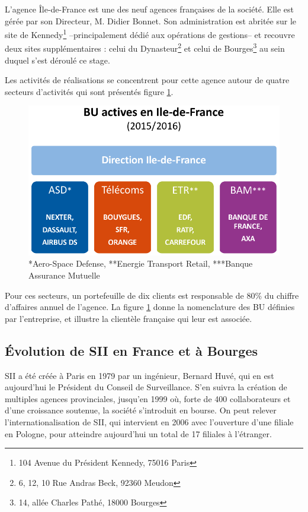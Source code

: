 L'agence Île-de-France est une des neuf agences françaises de la société. Elle est gérée par son Directeur, M. Didier Bonnet.
Son administration est abritée sur le site de Kennedy\footnote{104 Avenue du Président Kennedy, 75016 Paris} --principalement dédié aux opérations de gestions-- et recouvre deux sites supplémentaires : celui du 
Dynasteur\footnote{6, 12, 10 Rue Andras Beck, 92360 Meudon} et celui de Bourges\footnote{14, allée Charles Pathé, 18000 Bourges } au sein duquel s'est déroulé ce stage. 

Les activités de réalisations se concentrent pour cette agence autour de quatre secteurs d'activités qui sont présentés figure \ref{fig:BU-IDF}. 

\begin{figure}[h]
  \centering
    \includegraphics[width=.5\linewidth]{figures/BU-clients-IDF}
    \caption*{*Aero-Space Defense, **Energie Transport Retail, ***Banque Assurance Mutuelle}  
  \label{fig:BU-IDF}
\end{figure}

Pour ces secteurs, un portefeuille de dix clients est responsable de 80\% du chiffre d'affaires annuel de l'agence. 
La figure \ref{fig:BU-IDF} donne la nomenclature des \gls{BU} définies par l'entreprise, et illustre la clientèle française qui leur est associée.  

\subsection{\'{E}volution de SII en France et à Bourges}

SII a été créée à Paris en 1979 par un ingénieur, Bernard Huvé, qui en est aujourd'hui le Président du Conseil de Surveillance. 
S'en suivra la création de multiples agences provinciales, jusqu'en 1999 où, forte de 400 collaborateurs et d'une croissance soutenue, la société s'introduit en bourse.  
On peut relever l'internationalisation de SII, qui intervient en 2006 avec l'ouverture d'une filiale en Pologne, pour atteindre aujourd'hui un total de 17 filiales à l'étranger\cite{Bib_exercice_2015_2016}.  

